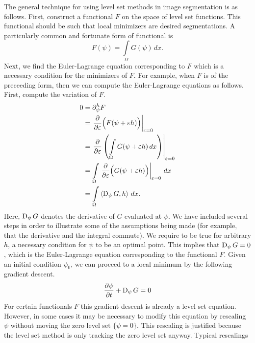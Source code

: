     The general technique for using level set methods in image segmentation is as follows.
    First, construct a functional \(F\) on the space of level set functions. This functional
    should be such that local minimizers are desired segmentations. A particularly
    common and fortunate form of functional is
    \[
        F(\psi) = \int \limits_\Omega G(\psi) \, dx.
    \]
    Next, we find the Euler-Lagrange equation corresponding to \(F\) which
    is a necessary condition for the minimizers of \(F\). For example,
    when \(F\) is of the preceeding form, then we can compute the
    Euler-Lagrange equations as follows. First, compute the \Gateaux
    variation of \(F\).
    \begin{align}
        0
            & = \partial_\psi^h F
            \nonumber
            \\
            & = \left. \frac{\partial}{\partial \varepsilon} \Big( F(\psi + \varepsilon h) \Big) \right|_{\varepsilon = 0}
            \nonumber
            \\
            & = \left. \frac{\partial}{\partial \varepsilon} \left( \int \limits_\Omega G(\psi + \varepsilon h) \, dx \right) \right|_{\varepsilon = 0}
            \nonumber
            \\
            & = \int \limits_\Omega \left. \frac{\partial}{\partial \varepsilon} \Big( G(\psi + \varepsilon h) \Big) \right|_{\varepsilon = 0} \, dx 
            \nonumber
            \\
            & = \int \limits_\Omega \left<\operatorname{D}_\psi G, h\right> \, dx.
            \label{eqn:ls-el-2}
    \end{align}
    Here, \(\operatorname{D}_\psi G\) denotes the \Frechet derivative of \(G\) evaluated at \(\psi\).
    We have included several steps in order to illustrate some of the assumptions being
    made (for example, that the derivative and the integral commute).
    We require  to be true for arbitrary \(h\), a necessary condition
    for \(\psi\) to be an optimal point. This implies that \(\operatorname{D}_\psi G = 0\), which
    is the Euler-Lagrange equation corresponding to the functional \(F\).
    Given an initial condition \(\psi_0\), we can proceed to a local minimum by
    the following gradient descent.
    \[
        \frac{\partial \psi}{\partial t} + \operatorname{D}_\psi G = 0
    \]
    For certain functionals \(F\) this gradient descent is already
    a level set equation. However, in some cases it may be necessary to
    modify this equation by rescaling \(\psi\) without moving the zero
    level set \(\{\psi = 0\}\). This rescaling is justified because the level
    set method is only tracking the zero level set anyway. Typical rescalings
